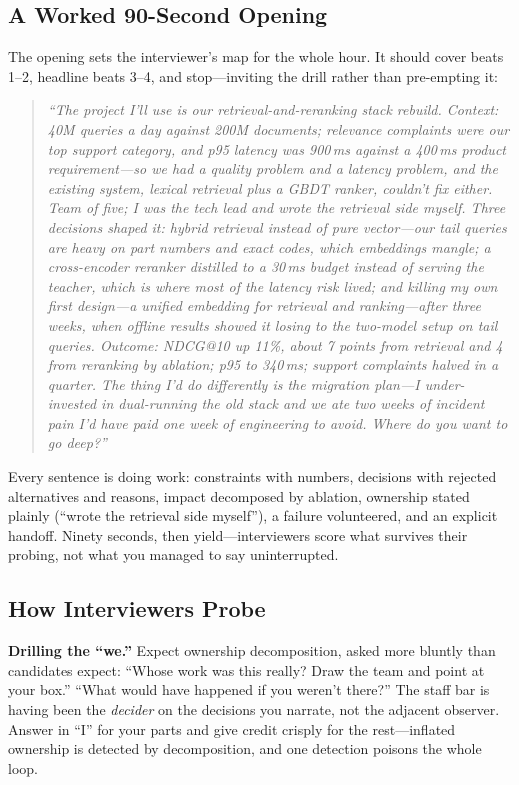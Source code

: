 \subsection{A Worked 90-Second Opening}

The opening sets the interviewer's map for the whole hour. It should cover beats 1--2, headline beats 3--4, and stop---inviting the drill rather than pre-empting it:

\begin{quote}\itshape
``The project I'll use is our retrieval-and-reranking stack rebuild. Context: 40M queries a day against 200M documents; relevance complaints were our top support category, and p95 latency was 900\,ms against a 400\,ms product requirement---so we had a quality problem and a latency problem, and the existing system, lexical retrieval plus a GBDT ranker, couldn't fix either. Team of five; I was the tech lead and wrote the retrieval side myself. Three decisions shaped it: hybrid retrieval instead of pure vector---our tail queries are heavy on part numbers and exact codes, which embeddings mangle; a cross-encoder reranker distilled to a 30\,ms budget instead of serving the teacher, which is where most of the latency risk lived; and killing my own first design---a unified embedding for retrieval and ranking---after three weeks, when offline results showed it losing to the two-model setup on tail queries. Outcome: NDCG@10 up 11\%, about 7 points from retrieval and 4 from reranking by ablation; p95 to 340\,ms; support complaints halved in a quarter. The thing I'd do differently is the migration plan---I under-invested in dual-running the old stack and we ate two weeks of incident pain I'd have paid one week of engineering to avoid. Where do you want to go deep?''
\end{quote}

Every sentence is doing work: constraints with numbers, decisions with rejected alternatives and reasons, impact decomposed by ablation, ownership stated plainly (``wrote the retrieval side myself''), a failure volunteered, and an explicit handoff. Ninety seconds, then yield---interviewers score what survives their probing, not what you managed to say uninterrupted.

\subsection{How Interviewers Probe}

\textbf{Drilling the ``we.''} Expect ownership decomposition, asked more bluntly than candidates expect: ``Whose work was this really? Draw the team and point at your box.'' ``What would have happened if you weren't there?'' The staff bar is having been the \textit{decider} on the decisions you narrate, not the adjacent observer. Answer in ``I'' for your parts and give credit crisply for the rest---inflated ownership is detected by decomposition, and one detection poisons the whole loop.

